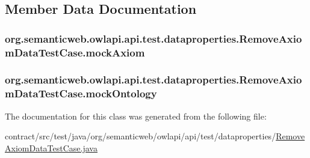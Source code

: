 \subsection{Member Data Documentation}
\hypertarget{classorg_1_1semanticweb_1_1owlapi_1_1api_1_1test_1_1dataproperties_1_1_remove_axiom_data_test_case_afce5b07d28fbd12f70dd54ee045c6d94}{
\subsubsection[{mock\-Axiom}]{ org.\-semanticweb.\-owlapi.\-api.\-test.\-dataproperties.\-Remove\-Axiom\-Data\-Test\-Case.\-mock\-Axiom\hspace{0.3cm}{\ttfamily [private]}}}\label{classorg_1_1semanticweb_1_1owlapi_1_1api_1_1test_1_1dataproperties_1_1_remove_axiom_data_test_case_afce5b07d28fbd12f70dd54ee045c6d94}
\hypertarget{classorg_1_1semanticweb_1_1owlapi_1_1api_1_1test_1_1dataproperties_1_1_remove_axiom_data_test_case_a1357f026522a7d81e5332caa613d0405}{
\subsubsection[{mock\-Ontology}]{ org.\-semanticweb.\-owlapi.\-api.\-test.\-dataproperties.\-Remove\-Axiom\-Data\-Test\-Case.\-mock\-Ontology\hspace{0.3cm}{\ttfamily [private]}}}\label{classorg_1_1semanticweb_1_1owlapi_1_1api_1_1test_1_1dataproperties_1_1_remove_axiom_data_test_case_a1357f026522a7d81e5332caa613d0405}


The documentation for this class was generated from the following file\-:\begin{DoxyCompactItemize}
\item 
contract/src/test/java/org/semanticweb/owlapi/api/test/dataproperties/\hyperlink{_remove_axiom_data_test_case_8java}{Remove\-Axiom\-Data\-Test\-Case.\-java}\end{DoxyCompactItemize}
